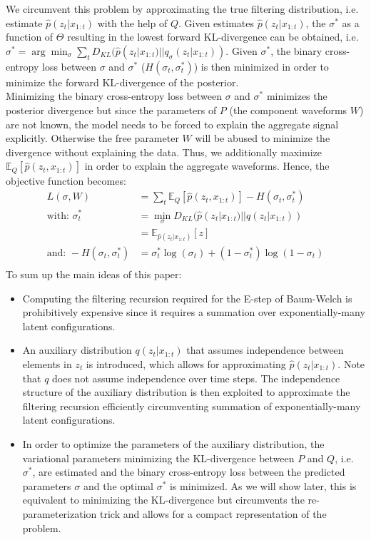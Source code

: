 We circumvent this problem by approximating the true filtering distribution, i.e. estimate $\hat{p}(z_{t}|x_{1:t})$ with the help of $Q$. Given estimates $\hat{p}(z_{t}|x_{1:t})$, the $\sigma^*$ as a function of $\Theta$ resulting in the lowest forward KL-divergence can be obtained, i.e. $\sigma^* = \arg \min_{\sigma}\sum_t D_{KL}(\hat{p}(z_{t}|x_{1:t}) || q_\sigma(z_{t}|x_{1:t}))$. Given $\sigma^*$, the binary cross-entropy loss between $\sigma$ and $\sigma^*$ ($H(\sigma_t, \sigma_t^*)$) is then minimized in order to minimize the forward KL-divergence of the posterior.\\
Minimizing the binary cross-entropy loss between $\sigma$ and $\sigma^*$ minimizes the posterior divergence but since the parameters of $P$ (the component waveforms $W$) are not known, the model needs to be forced to explain the aggregate signal explicitly. Otherwise the free parameter $W$ will be abused to minimize the divergence without explaining the data. Thus, we additionally maximize $\mathbb{E}_{Q}[\hat{p}(z_t, x_{1:t})]$ in order to explain the aggregate waveforms. Hence, the objective function becomes:
\begin{align*}
L(\sigma, W) &=  \sum_t\mathbb{E}_Q[\hat{p}(z_t, x_{1:t})] - H(\sigma_t, \sigma_t^*)\\
\text{with:\ \ } \sigma_t^* &= \min_{\sigma}D_{KL}(\hat{p}(z_{t}|x_{1:t}) || q(z_{t}|x_{1:t})) \\
 &= \mathbb{E}_{\hat{p}(z_{t}|x_{1:t})}[z] \\
\text{and:\ \ } -H(\sigma_t, \sigma_t^*) &= \sigma_t^*\log(\sigma_t) + (1-\sigma_t^*)\log(1-\sigma_t) \\
\end{align*}
To sum up the main ideas of this paper:
\begin{itemize}
\item Computing the filtering recursion required for the E-step of Baum-Welch is prohibitively expensive since it requires a summation over exponentially-many latent configurations.
\item An auxiliary distribution $q(z_t|x_{1:t})$ that assumes independence between elements in $z_t$ is introduced, which allows for approximating $\hat{p}(z_t|x_{1:t})$. Note that $q$ does not assume independence over time steps. The independence structure of the auxiliary distribution is then exploited to approximate the filtering recursion efficiently circumventing summation of exponentially-many latent configurations.
\item In order to optimize the parameters of the auxiliary distribution, the variational parameters minimizing the KL-divergence between $P$ and $Q$, i.e. $\sigma^*$, are estimated and the binary cross-entropy loss between the predicted parameters $\sigma$ and the optimal $\sigma^*$ is minimized. As we will show later, this is equivalent to minimizing the KL-divergence but circumvents the re-parameterization trick and allows for a compact representation of the problem.
\end{itemize}
